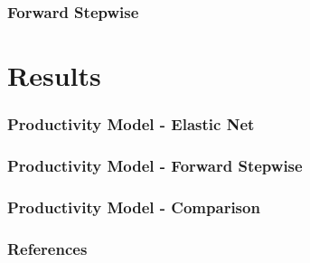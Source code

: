 \documentclass{beamer}
\begin{document}
\begin{frame}
\frametitle{Forward Stepwise}
\end{frame}

\section{Results}

\begin{frame}
\frametitle{Productivity Model - Elastic Net}
\end{frame}

\begin{frame}
\frametitle{Productivity Model - Forward Stepwise}
\end{frame}

\begin{frame}
\frametitle{Productivity Model - Comparison}
\end{frame}
 
\begin{frame}
\frametitle{References}

\end{frame}
\end{document}
